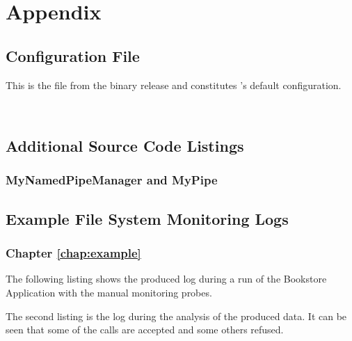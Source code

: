 % 


\appendix
\renewcommand{\thesection}{\Alph{section}} \setcounter{section}{0}
\chapter*{Appendix}
  \section{\KiekerMonitoringPart{} Configuration File}\label{sec:appdx:monitoringproperties}

This is the file \file{\monitoringPropertiesFile} from the binary release and 
constitutes \KiekerMonitoringPart{}'s default configuration.

\

\setXMLListing


\newpage


  \section{Additional Source Code Listings}
    \subsection{MyNamedPipeManager and MyPipe}\label{appendix:pipeListings}
      \setJavaCodeListing
      

      \setJavaCodeListing
      

\newpage
  \section{Example File System Monitoring Logs}

	\subsection{Chapter \ref{chap:example}}
		The following listing shows the produced log during a run of the Bookstore Application with the manual monitoring probes.
		
		The second listing is the log during the analysis of the produced data. It can be seen that some of the calls are accepted and some others refused.
		
	
